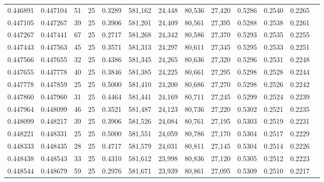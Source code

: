 \begin{tabular}{rrrrrrrrrrrrr}
0.446891 & 0.447104 &    51 &  25 &                                     0.3289 & 581,162 &  24,448 &  80,536 &  27,420 & 0.5286 & 0.2540 & 0.2265 \\
0.447105 & 0.447267 &    39 &  25 &                                     0.3906 & 581,201 &  24,409 &  80,561 &  27,395 & 0.5288 & 0.2538 & 0.2261 \\
0.447267 & 0.447441 &    67 &  25 &                                     0.2717 & 581,268 &  24,342 &  80,586 &  27,370 & 0.5293 & 0.2535 & 0.2255 \\
0.447443 & 0.447563 &    45 &  25 &                                     0.3571 & 581,313 &  24,297 &  80,611 &  27,345 & 0.5295 & 0.2533 & 0.2251 \\
0.447566 & 0.447655 &    32 &  25 &                                     0.4386 & 581,345 &  24,265 &  80,636 &  27,320 & 0.5296 & 0.2531 & 0.2248 \\
0.447655 & 0.447778 &    40 &  25 &                                     0.3846 & 581,385 &  24,225 &  80,661 &  27,295 & 0.5298 & 0.2528 & 0.2244 \\
0.447778 & 0.447859 &    25 &  25 &                                     0.5000 & 581,410 &  24,200 &  80,686 &  27,270 & 0.5298 & 0.2526 & 0.2242 \\
0.447860 & 0.447960 &    31 &  25 &                                     0.4464 & 581,441 &  24,169 &  80,711 &  27,245 & 0.5299 & 0.2524 & 0.2239 \\
0.447964 & 0.448099 &    46 &  25 &                                     0.3521 & 581,487 &  24,123 &  80,736 &  27,220 & 0.5302 & 0.2521 & 0.2235 \\
0.448099 & 0.448217 &    39 &  25 &                                     0.3906 & 581,526 &  24,084 &  80,761 &  27,195 & 0.5303 & 0.2519 & 0.2231 \\
0.448221 & 0.448331 &    25 &  25 &                                     0.5000 & 581,551 &  24,059 &  80,786 &  27,170 & 0.5304 & 0.2517 & 0.2229 \\
0.448333 & 0.448435 &    28 &  25 &                                     0.4717 & 581,579 &  24,031 &  80,811 &  27,145 & 0.5304 & 0.2514 & 0.2226 \\
0.448438 & 0.448543 &    33 &  25 &                                     0.4310 & 581,612 &  23,998 &  80,836 &  27,120 & 0.5305 & 0.2512 & 0.2223 \\
0.448544 & 0.448679 &    59 &  25 &                                     0.2976 & 581,671 &  23,939 &  80,861 &  27,095 & 0.5309 & 0.2510 & 0.2217 \\

\end{tabular}
